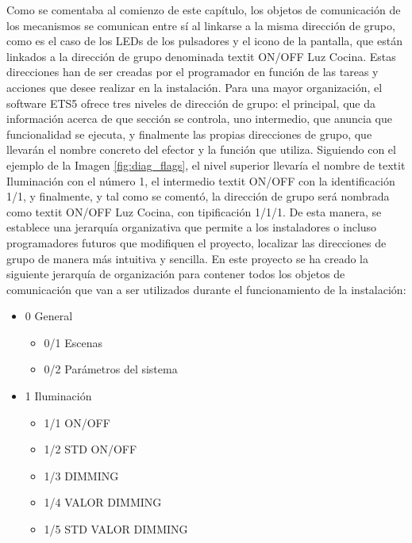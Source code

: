 Como se comentaba al comienzo de este capítulo, los objetos de comunicación de los mecanismos se comunican entre sí al linkarse a la misma dirección de grupo, como es el caso de los LEDs de los pulsadores y el icono de la pantalla, que están linkados a la dirección de grupo denominada textit {ON/OFF Luz Cocina}. Estas direcciones han de ser creadas por el programador en función de las tareas y acciones que desee realizar en la instalación. Para una mayor organización, el software ETS5 ofrece tres niveles de dirección de grupo: el principal, que da información acerca de que sección se controla, uno intermedio, que anuncia que funcionalidad se ejecuta, y finalmente las propias direcciones de grupo, que llevarán el nombre concreto del efector y la función que utiliza. Siguiendo con el ejemplo de la Imagen \ref{fig:diag_flags},  el nivel superior llevaría el nombre de textit {Iluminación} con el número 1, el intermedio textit {ON/OFF} con la identificación 1/1, y finalmente, y tal como se comentó, la dirección de grupo será nombrada como textit {ON/OFF Luz Cocina}, con tipificación 1/1/1. De esta manera, se establece una jerarquía organizativa que permite a los instaladores o incluso programadores futuros que modifiquen el proyecto, localizar las direcciones de grupo de manera más intuitiva y sencilla.
\newpage
En este proyecto se ha creado la siguiente jerarquía de organización para contener todos los objetos de comunicación que van a ser utilizados durante el funcionamiento de la instalación:

\begin{multicols}{2} 
\begin{flushleft} 
\begin{itemize}
\item{0 General}
\begin{itemize}
\item{0/1 Escenas}
\item {0/2 Parámetros del sistema}
\end{itemize} 
\end{itemize} 
\vspace{1.5cm}
\end{flushleft} 

\begin{flushright}  
\begin{itemize}
\item{1 Iluminación}
\begin{itemize}
\item{1/1 ON/OFF}
\item{1/2 STD ON/OFF}
\item{1/3 DIMMING}
\item{1/4 VALOR DIMMING}
\item{1/5 STD VALOR DIMMING}
\end{itemize} 
\end{itemize} 
\end{flushright} 
\end{multicols} 


